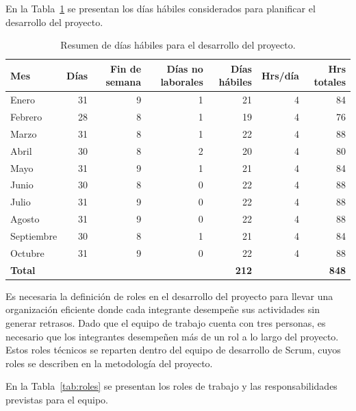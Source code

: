 En la Tabla~\ref{tab:dias} se presentan los días hábiles considerados para planificar el desarrollo del proyecto.

\begin{table}[H]
\centering
\caption{Resumen de días hábiles para el desarrollo del proyecto.}
\label{tab:dias}
\renewcommand{\arraystretch}{1.3}
\small
\begin{tabular}{|l|r|r|r|r|r|r|}
\hline
\textbf{Mes} & \textbf{Días} & \textbf{Fin de semana} & \textbf{Días no laborales} & \textbf{Días hábiles} & \textbf{Hrs/día} & \textbf{Hrs totales} \\
\hline
Enero      & 31 & 9 & 1 & 21 & 4 & 84  \\
\hline
Febrero    & 28 & 8 & 1 & 19 & 4 & 76  \\
\hline
Marzo      & 31 & 8 & 1 & 22 & 4 & 88  \\
\hline
Abril      & 30 & 8 & 2 & 20 & 4 & 80  \\
\hline
Mayo       & 31 & 9 & 1 & 21 & 4 & 84  \\
\hline
Junio      & 30 & 8 & 0 & 22 & 4 & 88  \\
\hline
Julio      & 31 & 9 & 0 & 22 & 4 & 88  \\
\hline
Agosto     & 31 & 9 & 0 & 22 & 4 & 88  \\
\hline
Septiembre & 30 & 8 & 1 & 21 & 4 & 84  \\
\hline
Octubre    & 31 & 9 & 0 & 22 & 4 & 88  \\
\hline
\textbf{Total} & & & & \textbf{212} & & \textbf{848} \\
\hline
\end{tabular}
\end{table}
 
Es necesaria la definición de roles en el desarrollo del proyecto para llevar una organización eficiente donde cada integrante desempeñe sus actividades sin generar retrasos. Dado que el equipo de trabajo cuenta con tres personas, es necesario que los integrantes desempeñen más de un rol a lo largo del proyecto. Estos roles técnicos se reparten dentro del equipo de desarrollo de Scrum, cuyos roles se describen en la metodología del proyecto.
 
En la Tabla~\ref{tab:roles} se presentan los roles de trabajo y las responsabilidades previstas para el equipo.

